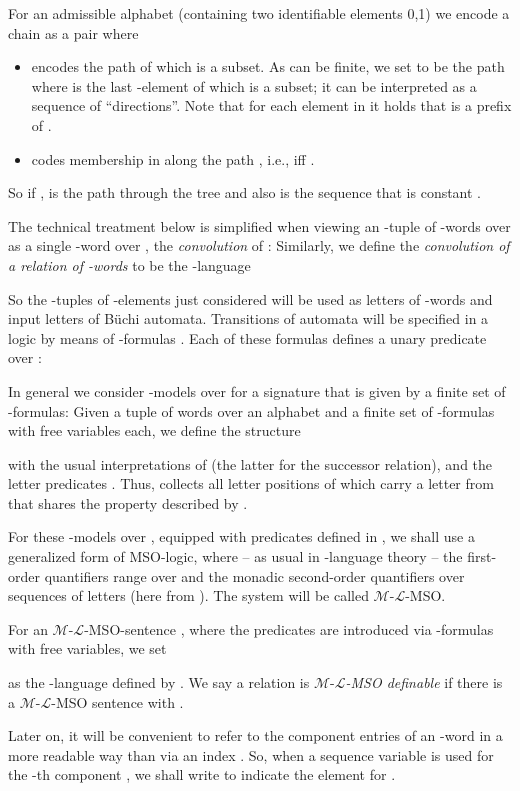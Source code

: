 \documentclass[copyright,creativecommons]{eptcs}
\theoremstyle{plain}
\theoremstyle{nonumberplain}
\newcommand{\m}{\ensuremath{\mathcal{M}}}
\newcommand{\el}{\ensuremath{\mathcal{L}}}
\newcommand{\ml}{\ensuremath{\m\textrm{-}\el}}
\begin{document}
 For an 
admissible alphabet  (containing two identifiable elements 0,1) we 
encode a chain  as a pair  where 
  \begin{itemize}
    \item  encodes the path of which  is a subset. As  can be finite, we set  to be the path  where  is the last -element of which  is a subset; it can be interpreted as a sequence of ``directions''. Note that for each element  in  it holds that  is a prefix of .
    \item  codes membership in  along the path , i.e.,  iff .
  \end{itemize}

So if ,  is the path  through the tree  and  also is 
the sequence that is constant . 

The technical treatment below is simplified when viewing an -tuple  
of -words 
over  as a single -word over , the \emph{convolution} of 
:  
Similarly, we define the \emph{convolution of a relation  of 
-words} to be the -language 


So the -tuples of -elements just considered will be used as 
letters of -words and input letters of B\"uchi automata. Transitions 
of automata will be specified in a logic  by means of 
-formulas . Each of these 
formulas defines a unary predicate  over :  


In general we consider -models over  for a signature that is given by a 
finite set  of -formulas: 
Given a tuple  of words over an alphabet  and 
a finite set  of -formulas  with  free 
variables each, we define the structure 
  
with the usual interpretations of  (the latter for the successor relation), 
and the letter predicates 
. 
 Thus,   collects all letter positions of  
 which carry a letter from  that shares the property described by .

For these -models over , equipped with predicates  defined 
in , we shall use a generalized form of MSO-logic, where -- as usual in -language theory --
the first-order quantifiers range over  and the monadic second-order
quantifiers over sequences of letters (here from ). The system will be called \ml-MSO. 

For an \ml-MSO-sentence , where the predicates  are introduced via 
-formulas  with  free variables, we set 
 
as the -language defined by . 
We say a relation  is \emph{\ml-MSO definable} 
if there is a \ml-MSO sentence  with .

Later on, it will be convenient to refer to the component entries of an -word  in a more readable way than via an index . So, when a sequence variable  is used for the -th component , we shall write  to indicate the element  for .
\end{document}
